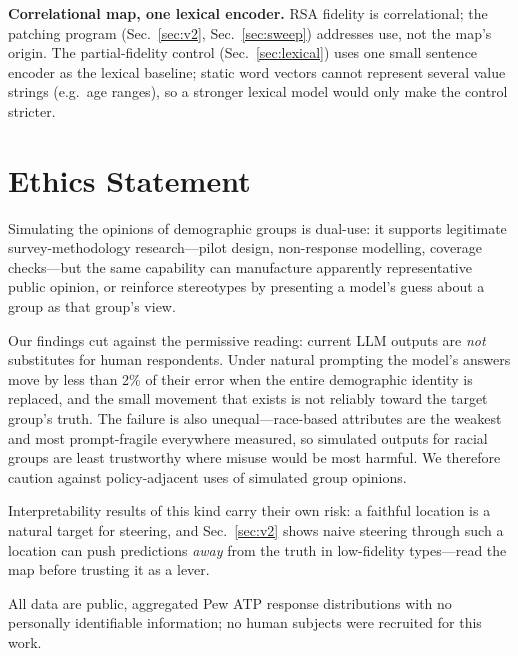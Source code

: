 \textbf{Correlational map, one lexical encoder.} RSA fidelity is
correlational; the patching program (Sec.~\ref{sec:v2},
Sec.~\ref{sec:sweep}) addresses use, not the map's origin. The
partial-fidelity control (Sec.~\ref{sec:lexical}) uses one small sentence
encoder as the lexical baseline; static word vectors cannot represent
several value strings (e.g.\ age ranges), so a stronger lexical model
would only make the control stricter.

\section*{Ethics Statement}
Simulating the opinions of demographic groups is dual-use: it supports
legitimate survey-methodology research---pilot design, non-response
modelling, coverage checks---but the same capability can manufacture
apparently representative public opinion, or reinforce stereotypes by
presenting a model's guess about a group as that group's view.

Our findings cut against the permissive reading: current LLM outputs are
\emph{not} substitutes for human respondents. Under natural prompting the
model's answers move by less than 2\% of their error when the entire
demographic identity is replaced, and the small movement that exists is
not reliably toward the target group's truth. The failure is also
unequal---race-based attributes are the weakest and most prompt-fragile
everywhere measured, so simulated outputs for racial groups are least
trustworthy where misuse would be most harmful. We therefore caution
against policy-adjacent uses of simulated group opinions.

Interpretability results of this kind carry their own risk: a faithful
location is a natural target for steering, and Sec.~\ref{sec:v2} shows
naive steering through such a location can push predictions \emph{away}
from the truth in low-fidelity types---read the map before trusting it as
a lever.

All data are public, aggregated Pew ATP response distributions with no
personally identifiable information; no human subjects were recruited for
this work.
